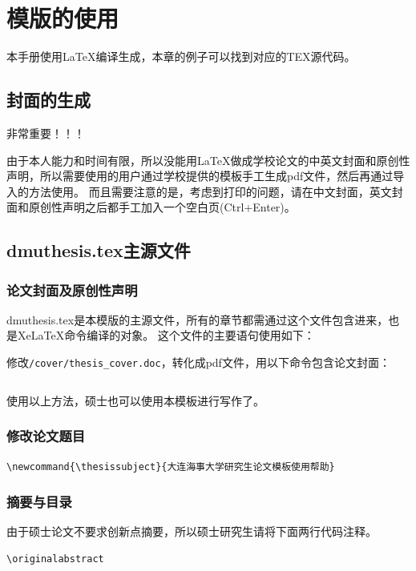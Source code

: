 \chapter{模版的使用}\label{ch:mannual}
本手册使用\LaTeX{}编译生成，本章的例子可以找到对应的TEX源代码。

\section{封面的生成}

非常重要！！！

由于本人能力和时间有限，所以没能用\LaTeX 做成学校论文的中英文封面和原创性声明，所以需要使用的用户通过学校提供的模板手工生成pdf文件，然后再通过导入的方法使用。
而且需要注意的是，考虑到打印的问题，请在中文封面，英文封面和原创性声明之后都手工加入一个空白页(Ctrl+Enter)。
\section{dmuthesis.tex主源文件}

\subsection{论文封面及原创性声明}
dmuthesis.tex是本模版的主源文件，所有的章节都需通过这个文件包含进来，也是Xe\LaTeX{}命令编译的对象。
这个文件的主要语句使用如下：

修改\verb|/cover/thesis_cover.doc|，转化成pdf文件，用以下命令包含论文封面：
\begin{verbatim}

\end{verbatim}
使用以上方法，硕士也可以使用本模板进行写作了。
\subsection{修改论文题目}
\begin{verbatim}
\newcommand{\thesissubject}{大连海事大学研究生论文模板使用帮助}
\end{verbatim}

\subsection{摘要与目录}
由于硕士论文不要求创新点摘要，所以硕士研究生请将下面两行代码注释。
\begin{verbatim}
\originalabstract 


\end{verbatim}

